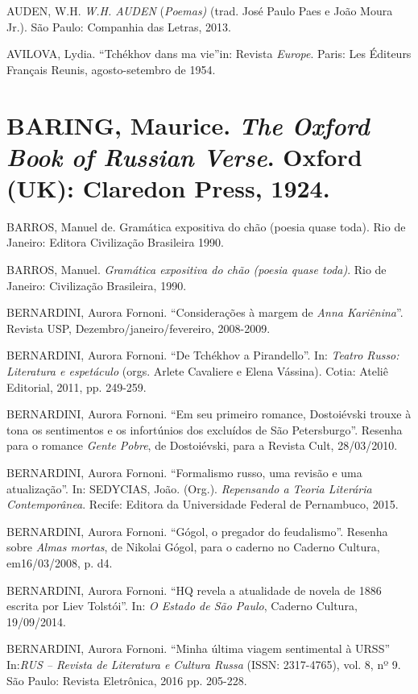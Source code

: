 AUDEN, W.H. \emph{W.H. AUDEN} (\emph{Poemas)} (trad. José Paulo Paes e
João Moura Jr.). São Paulo: Companhia das Letras, 2013.

AVILOVA, Lydia. ``Tchékhov dans ma vie''in: Revista \emph{Europe}.
Paris: Les Éditeurs Français Reunis, agosto-setembro de 1954.

\section{\texorpdfstring{BARING, Maurice. \emph{The Oxford Book of
Russian Verse}. Oxford (UK): Claredon Press,
1924.}{BARING, Maurice. The Oxford Book of Russian Verse. Oxford (UK): Claredon Press, 1924.}}\label{baring-maurice.-the-oxford-book-of-russian-verse.-oxford-uk-claredon-press-1924.}

BARROS, Manuel de. Gramática expositiva do chão (poesia quase toda). Rio
de Janeiro: Editora Civilização Brasileira 1990.

BARROS, Manuel. \emph{Gramática expositiva do chão (poesia quase toda)}.
Rio de Janeiro: Civilização Brasileira, 1990.

BERNARDINI, Aurora Fornoni. ``Considerações à margem de \emph{Anna
Kariênina}''. Revista USP, Dezembro/janeiro/fevereiro, 2008-2009.

BERNARDINI, Aurora Fornoni. ``De Tchékhov a Pirandello''. In:
\emph{Teatro Russo: Literatura e espetáculo} (orgs. Arlete Cavaliere e
Elena Vássina). Cotia: Ateliê Editorial, 2011, pp. 249-259.

BERNARDINI, Aurora Fornoni. ``Em seu primeiro romance, Dostoiévski
trouxe à tona os sentimentos e os infortúnios dos excluídos de São
Petersburgo''. Resenha para o romance \emph{Gente Pobre}, de
Dostoiévski, para a Revista Cult, 28/03/2010.

BERNARDINI, Aurora Fornoni. ``Formalismo russo, uma revisão e uma
atualização''. In: SEDYCIAS, João. (Org.). \emph{Repensando a Teoria
Literária Contemporânea}. Recife: Editora da Universidade Federal de
Pernambuco, 2015.

BERNARDINI, Aurora Fornoni. ``Gógol, o pregador do feudalismo''. Resenha
sobre \emph{Almas mortas}, de Nikolai Gógol, para o caderno no Caderno
Cultura, em16/03/2008, p. d4.

BERNARDINI, Aurora Fornoni. ``HQ revela a atualidade de novela de 1886
escrita por Liev Tolstói''. In: \emph{O Estado de São Paulo}, Caderno
Cultura, 19/09/2014.

BERNARDINI, Aurora Fornoni. ``Minha última viagem sentimental à URSS''
In:\emph{RUS -- Revista de Literatura e Cultura Russa} (ISSN:
2317-4765), vol. 8, nº 9. São Paulo: Revista Eletrônica, 2016 pp.
205-228.

